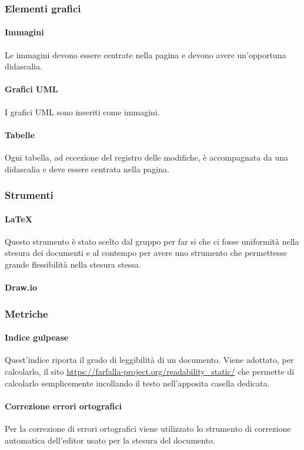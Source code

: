 \documentclass[../norme_di_progetto.tex]{subfiles}
\begin{document}
\subsubsection{Elementi grafici}

\paragraph{Immagini}
Le immagini devono essere centrate nella pagina e devono avere un'opportuna didascalia.

\paragraph{Grafici UML}
I grafici UML sono inseriti come immagini.

\paragraph{Tabelle}
Ogni tabella, ad eccezione del registro delle modifiche, è accompagnata da una didascalia e deve essere centrata nella pagina.

\subsubsection{Strumenti}

\paragraph{\LaTeX}
Questo strumento è stato scelto dal gruppo per far si che ci fosse uniformità nella stesura dei documenti e al contempo per avere uno strumento che permettesse grande flessibilità nella stesura stessa.

\paragraph{Draw.io}


\subsubsection{Metriche}

\paragraph{Indice gulpease}
Quest'indice riporta il grado di leggibilità di un documento. Viene adottato, per calcolarlo, il sito \url{https://farfalla-project.org/readability_static/} che permette di calcolarlo semplicemente incollando il testo nell'apposita casella dedicata.

\paragraph{Correzione errori ortografici}
Per la correzione di errori ortografici viene utilizzato lo strumento di correzione automatica dell'editor usato per la stesura del documento.
\end{document}
